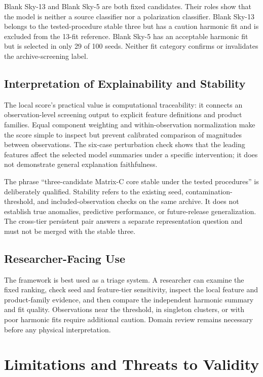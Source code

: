 \documentclass[conference]{IEEEtran}
\begin{document}
Blank Sky-13 and Blank Sky-5 are both fixed candidates. Their roles show that the model is neither a source classifier nor a polarization classifier. Blank Sky-13 belongs to the tested-procedure stable three but has a caution harmonic fit and is excluded from the 13-fit reference. Blank Sky-5 has an acceptable harmonic fit but is selected in only 29 of 100 seeds. Neither fit category confirms or invalidates the archive-screening label.


\subsection{Interpretation of Explainability and Stability}

The local score's practical value is computational traceability: it connects an observation-level screening output to explicit feature definitions and product families. Equal component weighting and within-observation normalization make the score simple to inspect but prevent calibrated comparison of magnitudes between observations. The six-case perturbation check shows that the leading features affect the selected model summaries under a specific intervention; it does not demonstrate general explanation faithfulness.


The phrase ``three-candidate Matrix-C core stable under the tested procedures'' is deliberately qualified. Stability refers to the existing seed, contamination-threshold, and included-observation checks on the same archive. It does not establish true anomalies, predictive performance, or future-release generalization. The cross-tier persistent pair answers a separate representation question and must not be merged with the stable three.


\subsection{Researcher-Facing Use}

The framework is best used as a triage system. A researcher can examine the fixed ranking, check seed and feature-tier sensitivity, inspect the local feature and product-family evidence, and then compare the independent harmonic summary and fit quality. Observations near the threshold, in singleton clusters, or with poor harmonic fits require additional caution. Domain review remains necessary before any physical interpretation.


\section{Limitations and Threats to Validity}
\end{document}
